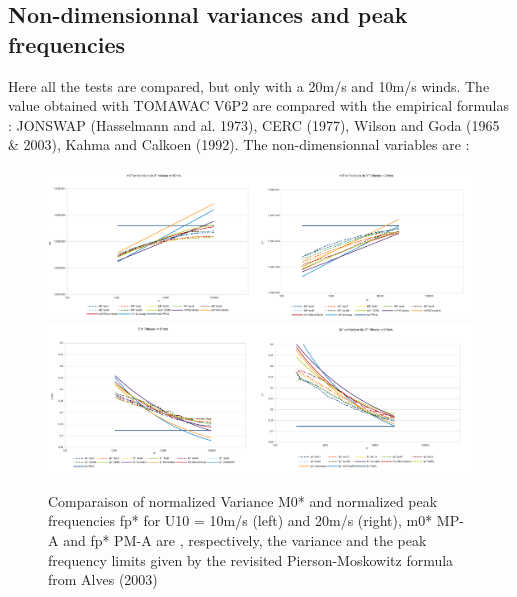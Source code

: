 \documentclass[10pt]{article}
\begin{document}
\subsection{Non-dimensionnal variances and peak frequencies}
Here all the tests are compared, but only with a 20m/s and 10m/s winds. The value obtained with TOMAWAC V6P2 are compared with the empirical formulas : JONSWAP (Hasselmann and al. 1973), CERC (1977), Wilson and Goda (1965 \& 2003), Kahma and Calkoen (1992). The non-dimensionnal variables are :\\
\begin{figure}[H]
  \centering
  	\includegraphics[width=0.5\textwidth]{M0v10id.pdf}\includegraphics[width=0.5\textwidth]{M0v20id.pdf}\\
  	\includegraphics[width=0.5\textwidth]{fpv10id.pdf}\includegraphics[width=0.5\textwidth]{fpv20id.pdf}\\
      \caption{Comparaison of normalized Variance M0* and normalized peak frequencies fp* for U10 = 10m/s (left) and 20m/s (right), m0* MP-A and fp* PM-A are , respectively, the variance and the peak frequency limits given by the revisited Pierson-Moskowitz formula from Alves (2003)}
\end{figure}
\end{document}
